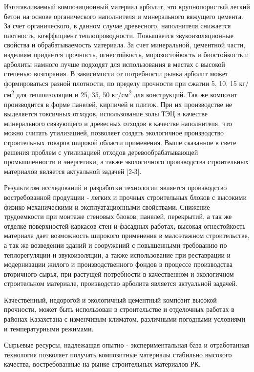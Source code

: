 Изготавливаемый композиционный материал арболит, это крупнопористый
легкий бетон на основе органического наполнителя и минерального вяжущего
цемента. За счет органического, в данном случае древесного, наполнителя
снижается плотность, коэффициент теплопроводности. Повышается
звукоизоляционные свойства и обрабатываемость материала. За счет
минеральной, цементной части, изделиям придается прочность,
огнестойкость, морозостойкость и биостойкость и арболиты намного лучше
подходят для использования в местах с высокой степенью возгорания. В
зависимости от потребности рынка арболит может формироваться разной
плотности, по пределу прочности при сжатии 5, 10, 15
кг/см\textsuperscript{2} для теплоизоляции и 25, 35, 50
кг/см\textsuperscript{2} для конструкций. Так же композит производится в
форме панелей, кирпичей и плиток. При их производстве не выделяется
токсичных отходов, использование золы ТЭЦ в качестве минерального
связующего и древесных отходов в качестве наполнителя, что можно считать
утилизацией, позволяет создать экологичное производство строительных
товаров широкой области применения. Выше сказанное в свете решения
проблем с утилизацией отходов деревообрабатывающей промышленности и
энергетики, а также экологичного производства строительных материалов
является актуальной задачей {[}2-3{]}.

Результатом исследований и разработки технологии является производство
востребованной продукции - легких и прочных строительных блоков с
высокими физико-механическими и эксплуатационными свойствами. Снижение
трудоемкости при монтаже стеновых блоков, панелей, перекрытий, а так же
отделке поверхностей каркасов стен и фасадных работах, высокая
огнестойкость материала дает возможность широкого применения в
малоэтажном строительстве, а так же возведении зданий и сооружений с
повышенными требованию по теплорегуляции и звукоизоляции, а также
использование при реставрации и модернизации жилого и производственного
фондов в процессе производства вторичного сырья, при растущей
потребности в качественном и экологичном строительном материале,
производство арболита является актуальной задачей.

Качественный, недорогой и экологичный цементный композит высокой
прочности, может быть использован в строительстве и отделочных работах в
районах Казахстана с изменчивым климатом, различными погодными условиями
и температурными режимами.

Сырьевые ресурсы, надлежащая опытно - экспериментальная база и
отработанная технология позволяет получать композитные материалы
стабильно высокого качества, востребованные на рынке строительных
материалов РК.

